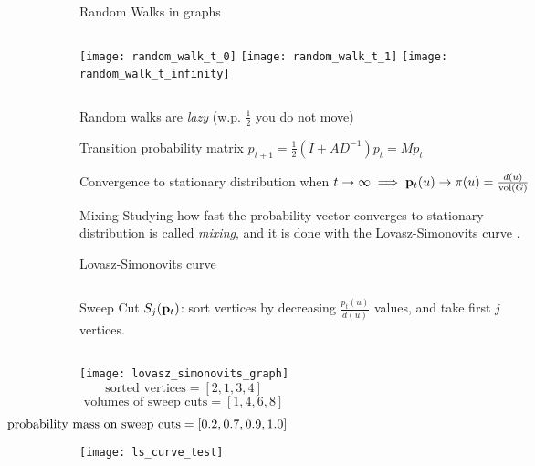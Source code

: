 \documentclass[../main.tex]{subfiles}
\begin{document}
    \begin{frame}{Random Walks in graphs}
    	\begin{columns}
    			\texttt{[image: random\_walk\_t\_0]}
    			\texttt{[image: random\_walk\_t\_1]}
    			\texttt{[image: random\_walk\_t\_infinity]}
    	\end{columns}
        
        Random walks are \textit{lazy} (w.p. $\frac{1}{2}$ you do not move)
            
        \begin{block}{Transition probability matrix}
            $p_{t+1} = \frac{1}{2}(I + AD^{-1}) p_t = M p_t$ 
        \end{block}
    
	    \begin{block}{Convergence to stationary distribution}
	    	when $t\to\infty \implies \bold{p}_t(u)\to \pi(u) = \frac{d(u)}{\text{vol}(G)}$
	    \end{block}
        
    \end{frame}
    
    
    \begin{frame}{Mixing}
           Studying how fast the probability vector converges to stationary distribution is called \textit{mixing}, and it is done with the Lovasz-Simonovits curve \cite{Lovsz1993RandomWI}.        
    \end{frame}
    
    \begin{frame}{Lovasz-Simonovits curve}
		\begin{columns}
 	    	\column{0.8\textwidth}
	        \begin{block}{Sweep Cut}
	            $S_j(\bold{p}_t)$: sort vertices by decreasing $\frac{p_t(u)}{d(u)}$ values, and take first $j$ vertices.
	        \end{block}
	    \end{columns}
    	\begin{columns}
    		\column{0.4\textwidth}
	    	\texttt{[image: lovasz\_simonovits\_graph]}
	    	\begin{equation*}
	    		\text{sorted vertices} = [2, 1, 3, 4]
    		\end{equation*}
			\begin{equation*}
    			\text{volumes of sweep cuts} = [1, 4, 6, 8]
    		\end{equation*}
    		\begin{equation*}
    		\hspace*{-2cm}\text{probability mass on sweep cuts} = [0.2, 0.7, 0.9, 1.0]
    		\end{equation*}
    		\texttt{[image: ls\_curve\_test]}
        \end{columns}
	\end{frame}
	
\end{document}
